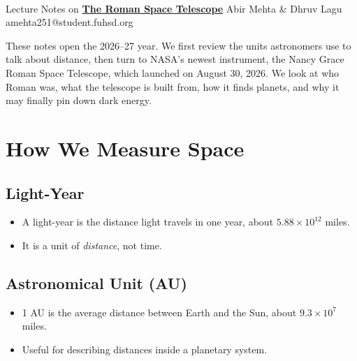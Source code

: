 \documentclass[11pt]{article}
\begin{document}
\thispagestyle{empty}
\bigskip \
\vspace{0.1cm}

\begin{center}
{\fontsize{22}{22} \selectfont Lecture Notes on}
\vskip 16pt
{\fontsize{36}{36} \selectfont \bf \sffamily
\href{https://fhsastrophysics.github.io/fhs-astrophysics/\#meeting-2627-1}{The Roman Space Telescope}}
\vskip 24pt
{\fontsize{18}{18} \selectfont \rmfamily Abir Mehta \& Dhruv Lagu}
\vskip 6pt
{\fontsize{14}{14} \selectfont \ttfamily amehta251@student.fuhsd.org}
\vskip 24pt
\end{center}

{\parindent0pt \baselineskip=15.5pt
These notes open the 2026--27 year. We first review the units astronomers use to
talk about distance, then turn to NASA's newest instrument, the Nancy Grace Roman
Space Telescope, which launched on August 30, 2026. We look at who Roman was, what
the telescope is built from, how it finds planets, and why it may finally pin down
dark energy.
}

\newpage
\microtoc
\newpage

\section{How We Measure Space}

\subsection{Light-Year}

\begin{itemize}
\item A light-year is the distance light travels in one year, about
$5.88 \times 10^{12}$ miles.
\item It is a unit of \emph{distance}, not time.
\end{itemize}

\subsection{Astronomical Unit (AU)}

\begin{itemize}
\item 1 AU is the average distance between Earth and the Sun, about
$9.3 \times 10^{7}$ miles.
\item Useful for describing distances inside a planetary system.
\end{itemize}
\end{document}
